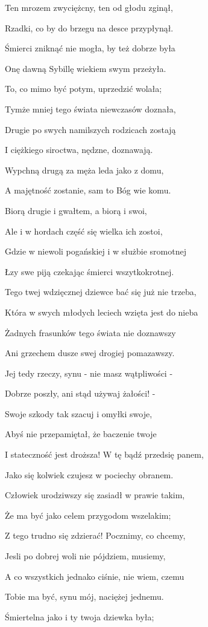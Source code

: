 \documentclass{article}
\begin{document}
Ten mrozem zwyciężcny, ten od głodu zginął,

Rzadki, co by do brzegu na desce przypłynął.

Śmierci zniknąć nie mogła, by też dobrze była

Onę dawną Sybillę wiekiem swym przeżyła.

To, co mimo być potym, uprzedzić wolała;

Tymże mniej tego świata niewczasów doznała,

Drugie po swych namilszych rodzicach zostają

I ciężkiego siroctwa, nędzne, doznawają.

Wypchną drugą za męża leda jako z domu,

A majętność zostanie, sam to Bóg wie komu.

Biorą drugie i gwałtem, a biorą i swoi,

Ale i w hordach część się wielka ich zostoi,

Gdzie w niewoli pogańskiej i w służbie sromotnej

Łzy swe piją czekając śmierci wszytkokrotnej.

Tego twej wdzięcznej dziewce bać się już nie trzeba,

Która w swych młodych leciech wzięta jest do nieba

Żadnych frasunków tego świata nie doznawszy

Ani grzechem dusze swej drogiej pomazawszy.

Jej tedy rzeczy, synu - nie masz wątpliwości -

Dobrze poszły, ani stąd używaj żałości! -

Swoje szkody tak szacuj i omyłki swoje,

Abyś nie przepamiętał, że baczenie twoje

I stateczność jest droższa! W tę bądź przedsię panem,

Jako się kolwiek czujesz w pociechy obranem.

Człowiek urodziwszy się zasiadł w prawie takim,

Że ma być jako celem przygodom wszelakim;

Z tego trudno się zdzierać! Pocznimy, co chcemy,

Jesli po dobrej woli nie pójdziem, musiemy,

A co wszystkich jednako ciśnie, nie wiem, czemu

Tobie ma być, synu mój, naciężej jednemu.

Śmiertelna jako i ty twoja dziewka była;
\end{document}
